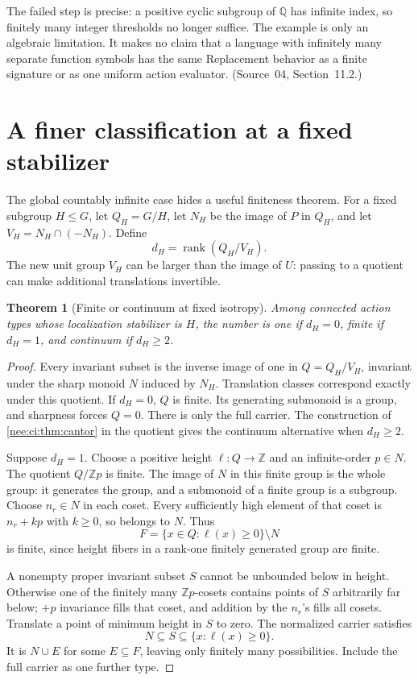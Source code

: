 \documentclass[11pt,letterpaper]{article}
\numberwithin{equation}{section}
\theoremstyle{plain}
\newtheorem{theorem}{Theorem}[section]
\theoremstyle{definition}
\theoremstyle{remark}
\newcommand{\ZZ}{\mathbb Z}
\newcommand{\QQ}{\mathbb Q}
\newcommand{\rank}{\operatorname{rank}}
\newcommand{\srcs}[1]{\par\noindent{\footnotesize\textit{Sources:} #1}\par}
\begin{document}
The failed step is precise: a positive cyclic
subgroup of $\QQ$ has infinite index, so finitely
many integer thresholds no longer suffice.
The example is only an algebraic limitation.
It makes no claim that a language with infinitely
many separate function symbols has the same
Replacement behavior as a finite signature or
as one uniform action evaluator. (Source~04, Section~11.2.)

\section{A finer classification at a fixed stabilizer}\label{nee:ci:sec:fixed}

The global countably infinite case hides a useful finiteness theorem.
For a fixed subgroup $H\leq G$, let $Q_H=G/H$, let $N_H$ be the
image of $P$ in $Q_H$, and let $V_H=N_H\cap(-N_H)$. Define
\[
d_H=\rank(Q_H/V_H).
\]
The new unit group $V_H$ can be larger than the image of $U$:
passing to a quotient can make additional translations invertible.

\begin{theorem}[Finite or continuum at fixed isotropy]\label{nee:ci:thm:fixed}
Among connected action types whose localization stabilizer is $H$,
the number is one if $d_H=0$, finite if $d_H=1$, and continuum
if $d_H\geq2$.
\end{theorem}
\srcs{source~04, Theorem~4.1.}
\begin{proof}
Every invariant subset is the inverse image of one in
$Q=Q_H/V_H$, invariant under the sharp monoid $N$ induced by
$N_H$. Translation classes correspond exactly under this quotient.
If $d_H=0$, $Q$ is finite. Its generating submonoid is a group,
and sharpness forces $Q=0$. There is only the full carrier.
The construction of \cref{nee:ci:thm:cantor} in the quotient gives the
continuum alternative when $d_H\geq2$.

Suppose $d_H=1$. Choose a positive height $\ell:Q\to\ZZ$ and an
infinite-order $p\in N$. The quotient $Q/\ZZ p$ is finite.
The image of $N$ in this finite group is the whole group: it
generates the group, and a submonoid of a finite group is a subgroup.
Choose $n_r\in N$ in each coset. Every sufficiently high element
of that coset is $n_r+kp$ with $k\geq0$, so belongs to $N$.
Thus
\[
F=\{x\in Q:\ell(x)\geq0\}\setminus N
\]
is finite, since height fibers in a rank-one finitely generated
group are finite.

A nonempty proper invariant subset $S$ cannot be unbounded below
in height. Otherwise one of the finitely many $\ZZ p$-cosets
contains points of $S$ arbitrarily far below; $+p$ invariance
fills that coset, and addition by the $n_r$'s fills all cosets.
Translate a point of minimum height in $S$ to zero. The normalized
carrier satisfies
\[
N\subseteq S\subseteq\{x:\ell(x)\geq0\}.
\]
It is $N\cup E$ for some $E\subseteq F$, leaving only finitely
many possibilities. Include the full carrier as one further type.
\end{proof}
\end{document}
